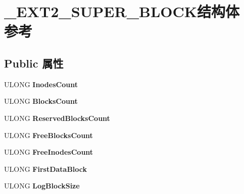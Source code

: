 \hypertarget{struct___e_x_t2___s_u_p_e_r___b_l_o_c_k}{}\section{\+\_\+\+E\+X\+T2\+\_\+\+S\+U\+P\+E\+R\+\_\+\+B\+L\+O\+C\+K结构体 参考}
\label{struct___e_x_t2___s_u_p_e_r___b_l_o_c_k}
\subsection*{Public 属性}
\begin{DoxyCompactItemize}
\item 
\mbox{\label{struct___e_x_t2___s_u_p_e_r___b_l_o_c_k_a7d7782ba8539f6658e8140be4f457852}} 
U\+L\+O\+NG {\bfseries Inodes\+Count}
\item 
\mbox{\label{struct___e_x_t2___s_u_p_e_r___b_l_o_c_k_a9765c22eab12a345deae305d4a2845e1}} 
U\+L\+O\+NG {\bfseries Blocks\+Count}
\item 
\mbox{\label{struct___e_x_t2___s_u_p_e_r___b_l_o_c_k_ac8d812b4b2bbd4ed9f1068280bce0f71}} 
U\+L\+O\+NG {\bfseries Reserved\+Blocks\+Count}
\item 
\mbox{\label{struct___e_x_t2___s_u_p_e_r___b_l_o_c_k_ad98006ccee2658bcd2e639796086f5a6}} 
U\+L\+O\+NG {\bfseries Free\+Blocks\+Count}
\item 
\mbox{\label{struct___e_x_t2___s_u_p_e_r___b_l_o_c_k_a28a4b7e32e6551b0c15f2a3c07e247c3}} 
U\+L\+O\+NG {\bfseries Free\+Inodes\+Count}
\item 
\mbox{\label{struct___e_x_t2___s_u_p_e_r___b_l_o_c_k_ad7938f0f596154fd9d5e47dbdcad8a80}} 
U\+L\+O\+NG {\bfseries First\+Data\+Block}
\item 
\mbox{\label{struct___e_x_t2___s_u_p_e_r___b_l_o_c_k_af209cee1f1351fbebd24debb69d15e2e}} 
U\+L\+O\+NG {\bfseries Log\+Block\+Size}
\item 

\end{DoxyCompactItemize}
